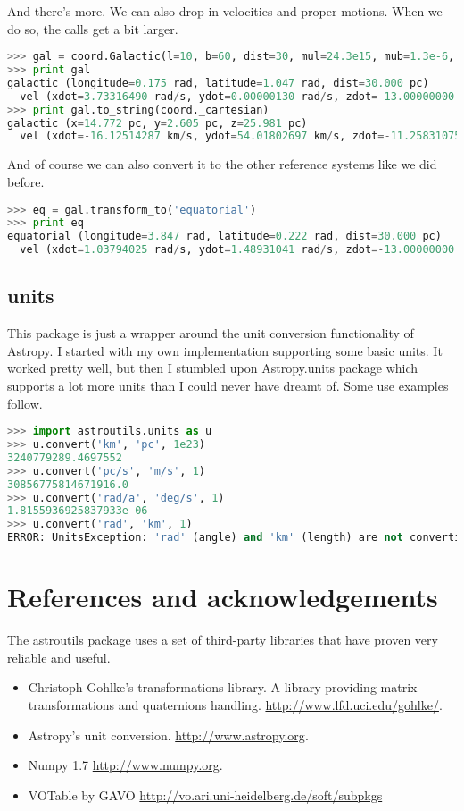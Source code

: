 \documentclass[
a4paper, %
11pt, %
onecolumn, %
openany, %
]{memoir}
\begin{document}
And there's more. We can also drop in velocities and proper motions. When we do so, the calls
get a bit larger.

\begin{lstlisting}[language=Python]
>>> gal = coord.Galactic(l=10, b=60, dist=30, mul=24.3e15, mub=1.3e-6, radialvelocity=-13, unit=('deg','deg','pc','mas/a','rad/s','km/s'))
>>> print gal
galactic (longitude=0.175 rad, latitude=1.047 rad, dist=30.000 pc)
  vel (xdot=3.73316490 rad/s, ydot=0.00000130 rad/s, zdot=-13.00000000 km/s)
>>> print gal.to_string(coord._cartesian)
galactic (x=14.772 pc, y=2.605 pc, z=25.981 pc)
  vel (xdot=-16.12514287 km/s, ydot=54.01802697 km/s, zdot=-11.25831075 km/s)
\end{lstlisting}

And of course we can also convert it to the other reference systems like we did before.

\begin{lstlisting}[language=Python]
>>> eq = gal.transform_to('equatorial')
>>> print eq
equatorial (longitude=3.847 rad, latitude=0.222 rad, dist=30.000 pc)
  vel (xdot=1.03794025 rad/s, ydot=1.48931041 rad/s, zdot=-13.00000000 km/s)
\end{lstlisting}

\subsection{units}

This package is just a wrapper around the unit conversion functionality of Astropy. I started with my own implementation
supporting some basic units. It worked pretty well, but then I stumbled upon Astropy.units package which supports
a lot more units than I could never have dreamt of.
Some use examples follow.

\begin{lstlisting}[language=Python]
>>> import astroutils.units as u
>>> u.convert('km', 'pc', 1e23)
3240779289.4697552
>>> u.convert('pc/s', 'm/s', 1)
30856775814671916.0
>>> u.convert('rad/a', 'deg/s', 1)
1.8155936925837933e-06
>>> u.convert('rad', 'km', 1)
ERROR: UnitsException: 'rad' (angle) and 'km' (length) are not convertible [astropy.units.core]
\end{lstlisting}

\section{References and acknowledgements}
The astroutils package uses a set of third-party libraries that have proven very reliable and useful.
\begin{itemize}
\item Christoph Gohlke's transformations library. A library providing matrix transformations and quaternions handling. \href{http://www.lfd.uci.edu/gohlke/}{http://www.lfd.uci.edu/gohlke/}.
\item Astropy's unit conversion. \href{http://www.astropy.org}{http://www.astropy.org}.
\item Numpy 1.7 \href{http://www.numpy.org}{http://www.numpy.org}.
\item VOTable by GAVO \href{http://vo.ari.uni-heidelberg.de/soft/subpkgs}{http://vo.ari.uni-heidelberg.de/soft/subpkgs}
\end{itemize}
\end{document}
